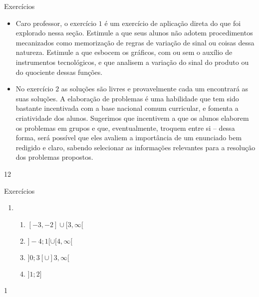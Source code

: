 \def\currentcolor{cor1}
\clearmargin\clearmargin
\begin{sugestions}{Exercícios}
{
\begin{itemize}
\item Caro professor, o exercício $1$ é um exercício de aplicação direta do que foi explorado nessa seção. Estimule a que seus alunos não adotem procedimentos mecanizados como memorização de regras de variação de sinal ou coisas dessa natureza. Estimule a que esbocem os gráficos, com ou sem o auxílio de instrumentos tecnológicos, e que analisem a variação do sinal do produto ou do quociente dessas funções.
\item  No exercício $2$ as soluções são livres e provavelmente cada um encontrará as suas soluções. A elaboração de problemas é uma habilidade que tem sido bastante incentivada com a base nacional comum curricular, e fomenta a criatividade dos alunos. Sugerimos que incentivem a que os alunos elaborem os problemas em grupos e que, eventualmente, troquem entre si – dessa forma, será possível que eles avaliem a importância de um enunciado bem redigido e claro, sabendo selecionar as informações relevantes para a resolução dos problemas propostos.
\end{itemize}
}{1}{2}
\end{sugestions}
\begin{answer}{Exercícios}
{\exerciselist
\begin{enumerate}
\item 
\begin{enumerate}
\item $[-3,-2]\cup [3,\infty [$
\item $]-4;1[\cup [4, \infty[$
\item $ ]0;3[ \cup ]3, \infty[$
\item $ ]1;2]$
\end{enumerate}
\end{enumerate}
}{1}
\end{answer}
\def\currentcolor{session4}


